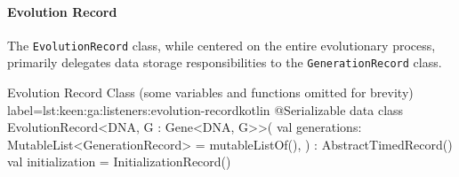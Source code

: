     \paragraph{Evolution Record}
      The \texttt{EvolutionRecord} class, while centered on the entire 
      evolutionary process, primarily delegates data storage responsibilities 
      to the \texttt{GenerationRecord} class.

      \begin{code}{
        Evolution Record Class (some variables and functions omitted for 
        brevity)
      }{label=lst:keen:ga:listeners:evolution-record}{kotlin}
        @Serializable
        data class EvolutionRecord<DNA, G : Gene<DNA, G>>(
            val generations: MutableList<GenerationRecord> = mutableListOf(),
        ) : AbstractTimedRecord() {
            val initialization = InitializationRecord()
        }
      \end{code}
      